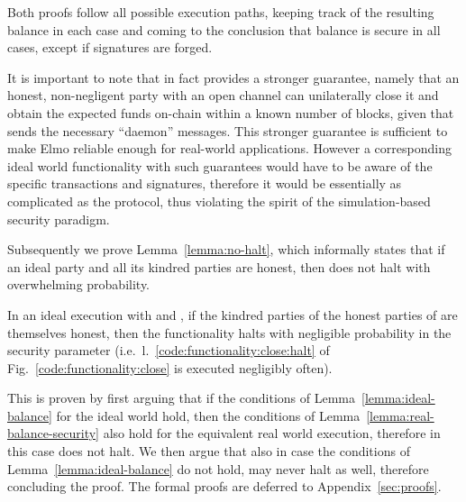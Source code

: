   Both proofs follow all possible execution paths, keeping track of the
  resulting balance in each case and coming to the conclusion that balance is
  secure in all cases, except if signatures are forged.

  It is important to note that in fact \pchan provides a stronger guarantee,
  namely that an honest, non-negligent party with an open channel can
  unilaterally close it and obtain the expected funds on-chain within a known
  number of blocks, given that \environment sends the necessary ``daemon'' messages.
  This stronger guarantee is sufficient to make Elmo reliable
  enough for real-world applications. However a corresponding ideal world
  functionality with such guarantees would have to be aware of the specific
  transactions and signatures, therefore it would be essentially as complicated
  as the protocol, thus violating the spirit of the simulation-based security
  paradigm.

  Subsequently we prove Lemma~\ref{lemma:no-halt}, which informally states that
  if an ideal party and all its kindred parties are honest, then \fchan does not
  halt with overwhelming probability.

\begin{lemma}[No halt]
\label{lemma:no-halt}
  In an ideal execution with \fchan and \simulator, if the kindred parties of
  the honest parties of \fchan are themselves honest, then the functionality
  halts with negligible probability in the security parameter (i.e.\
  l.~\ref{code:functionality:close:halt} of Fig.~\ref{code:functionality:close}
  is executed negligibly often).
\end{lemma}

  This is proven by first arguing that if
  the conditions of Lemma~\ref{lemma:ideal-balance} for the ideal world hold,
  then the conditions of Lemma~\ref{lemma:real-balance-security} also hold for
  the equivalent real world execution, therefore in this case \fchan does not
  halt. We then argue that also in case the conditions of
  Lemma~\ref{lemma:ideal-balance} do not hold, \fchan may never halt as well,
  therefore concluding the proof.
  The formal proofs are deferred to Appendix~\ref{sec:proofs}.

